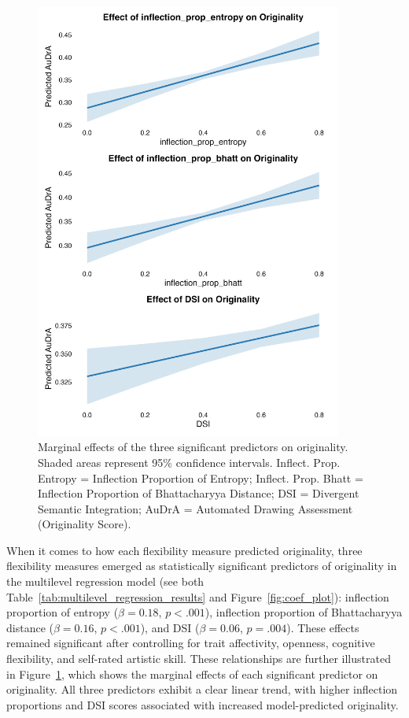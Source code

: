 \documentclass[../MA_Thesis.tex]{subfiles}
\begin{document}
\begin{figure}[H]
  \centering
  \includegraphics[height=0.85\textheight, width=0.9\textwidth]{../analysis/results/main_results/multilevel_regression/marginal_effects_plot.png}
  \caption{Marginal effects of the three significant predictors on originality. Shaded areas represent 95\% confidence intervals. Inflect. Prop. Entropy = Inflection Proportion of Entropy; Inflect. Prop. Bhatt = Inflection Proportion of Bhattacharyya Distance; DSI = Divergent Semantic Integration; AuDrA = Automated Drawing Assessment (Originality Score).}
  \label{fig:marginal_plot}
\end{figure}

When it comes to how each flexibility measure predicted originality, three flexibility measures emerged as statistically significant predictors of originality in the multilevel regression model (see both Table~\ref{tab:multilevel_regression_results} and  Figure~\ref{fig:coef_plot}): inflection proportion of entropy ($\beta = 0.18$, $p < .001$), inflection proportion of Bhattacharyya distance ($\beta = 0.16$, $p < .001$), and DSI ($\beta = 0.06$, $p = .004$). These effects remained significant after controlling for trait affectivity, openness, cognitive flexibility, and self-rated artistic skill. These relationships are further illustrated in Figure~\ref{fig:marginal_plot}, which shows the marginal effects of each significant predictor on originality. All three predictors exhibit a clear linear trend, with higher inflection proportions and DSI scores associated with increased model-predicted originality. 
\end{document}
